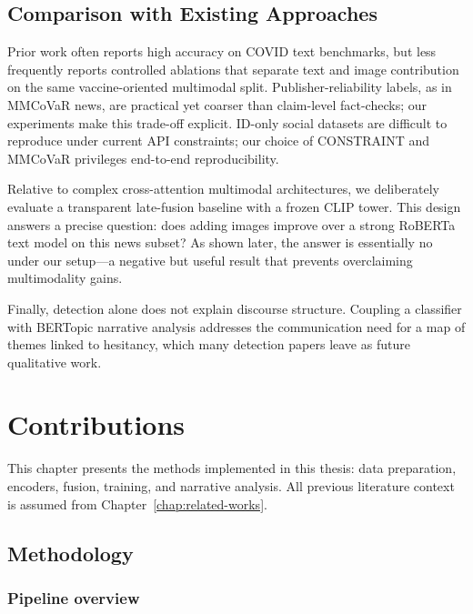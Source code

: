 \documentclass[12pt, a4paper]{report}
\begin{document}
\section{Comparison with Existing Approaches}
\label{sec:comparison}

Prior work often reports high accuracy on COVID text benchmarks, but less frequently reports controlled ablations that separate text and image contribution on the same vaccine-oriented multimodal split.
Publisher-reliability labels, as in MMCoVaR news, are practical yet coarser than claim-level fact-checks; our experiments make this trade-off explicit.
ID-only social datasets are difficult to reproduce under current API constraints; our choice of CONSTRAINT and MMCoVaR privileges end-to-end reproducibility.

Relative to complex cross-attention multimodal architectures, we deliberately evaluate a transparent late-fusion baseline with a frozen CLIP tower.
This design answers a precise question: does adding images improve over a strong RoBERTa text model on this news subset?
As shown later, the answer is essentially no under our setup---a negative but useful result that prevents overclaiming multimodality gains.

Finally, detection alone does not explain discourse structure.
Coupling a classifier with BERTopic narrative analysis addresses the communication need for a map of themes linked to hesitancy, which many detection papers leave as future qualitative work.


\chapter{Contributions}
\label{chap:contribution}

This chapter presents the methods implemented in this thesis: data preparation, encoders, fusion, training, and narrative analysis.
All previous literature context is assumed from Chapter~\ref{chap:related-works}.

\section{Methodology}
\label{sec:methodology}

\subsection{Pipeline overview}
\end{document}
